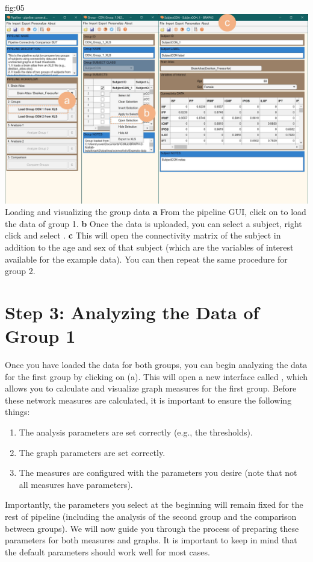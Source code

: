 \documentclass[justified]{tufte-handout}
\begin{document}
{fig:05}
{
	\includegraphics{fig05.jpg}
}
{Loading and visualizing the group data}
{
	{\bf a} From the pipeline GUI, click on  to load the data of group 1.
	{\bf b} Once the data is uploaded, you can select a subject, right click and select .
	{\bf c} This will open the connectivity matrix of the subject in addition to the age and sex of that subject (which are the variables of interest available for the example data).
	You can then repeat the same procedure for group 2.
}


\clearpage
\section{Step 3: Analyzing the Data of Group 1}

Once you have loaded the data for both groups, you can begin analyzing the data for the first group by clicking on  (a). 
This will open a new interface called , which allows you to calculate and visualize graph measures for the first group. 
Before these network measures are calculated, it is important to ensure the following things: 
\begin{enumerate}
	\item The analysis parameters are set correctly (e.g., the thresholds).
	\item The graph parameters are set correctly.
	\item The measures are configured with the parameters you desire (note that not all measures have parameters).
\end{enumerate}

Importantly, the parameters you select at the beginning will remain fixed for the rest of pipeline (including the analysis of the second group and the comparison between groups). We will now guide you through the process of preparing these parameters for both measures and graphs. It is important to keep in mind that the default parameters should work well for most cases.
\end{document}
